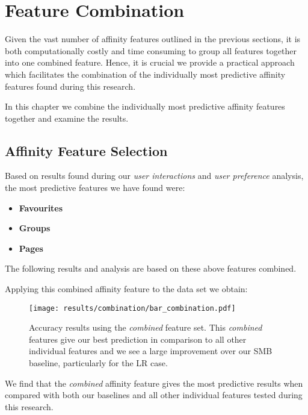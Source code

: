 
\chapter{Feature Combination}
\label{cha:bma}

Given the vast number of affinity features outlined in the previous sections, it is both computationally costly and time 
consuming to group all features together into one combined feature. Hence, it is crucial we provide a practical approach which 
facilitates the combination of the individually most predictive affinity features found during this research.

In this chapter we combine the individually most predictive affinity features together and examine the results.

\section{Affinity Feature Selection}
\label{sec:notation}

Based on results found during our \emph{user interactions} and \emph{user preference} analysis, the most predictive features we have found were:
\begin{itemize}
\item \textbf{Favourites}
\item \textbf{Groups}
\item \textbf{Pages}
\end{itemize}

The following results and analysis are based on these above features combined.

\clearpage

Applying this combined affinity feature to the data set we obtain:

\begin{figure}[h]
	\begin{center}
		\texttt{[image: results/combination/bar\_combination.pdf]}
		\caption{Accuracy results using the \emph{combined} feature set. This \emph{combined} features give our best prediction 
		in comparison to all other individual features and we see a large improvement over our SMB baseline, particularly for the LR case.}
	\end{center}
\end{figure}

\clearpage

We find that the \emph{combined} affinity feature gives the most predictive results when compared with both our baselines and all
other individual features tested during this research.

